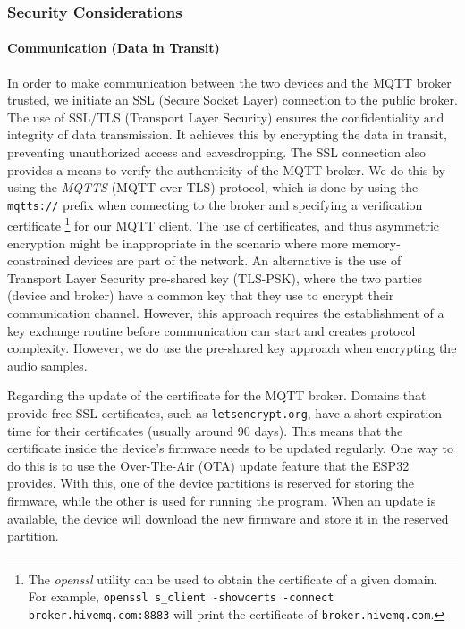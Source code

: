 \documentclass[conference]{IEEEtran}
\begin{document}
\subsubsection{Security Considerations}

\paragraph{Communication (Data in Transit)}

In order to make communication between the two devices and the MQTT broker
trusted, we initiate an SSL (Secure Socket Layer) connection to the public broker. 
The use of SSL/TLS (Transport Layer Security)
ensures the confidentiality and integrity of data transmission. 
It achieves this by encrypting the data in transit, preventing
unauthorized access and eavesdropping. The SSL connection also provides a means
to verify the authenticity of the MQTT broker.
We do this by using the \textit{MQTTS} (MQTT over TLS) protocol, which is done 
by using the \texttt{mqtts://} prefix when connecting to the broker and specifying 
a verification certificate
\footnote{The \textit{openssl} utility can be used to obtain the certificate of a given domain.
For example, \texttt{openssl s\_client -showcerts -connect broker.hivemq.com:8883} will print the certificate of \texttt{broker.hivemq.com}.}
for our MQTT client.
The use of certificates, and thus asymmetric encryption might be inappropriate in the scenario where more 
memory-constrained devices are part of the network. 
An alternative is the use of Transport Layer Security pre-shared key (TLS-PSK)\cite{rfc4279}, where the two parties 
(device and broker) have a common key that they use to encrypt their communication channel.
However, this approach requires the establishment of a key exchange routine before communication can start
and creates protocol complexity.
However, we do use the pre-shared key approach when encrypting the audio samples.

Regarding the update of the certificate for the MQTT broker.
Domains that provide free SSL certificates, such as \texttt{letsencrypt.org}, have a short expiration time for their certificates (usually around 90 days).
This means that the certificate inside the device's firmware needs to be updated regularly.
One way to do this is to use the Over-The-Air (OTA) update feature that the ESP32 provides.
With this, one of the device partitions is reserved for storing the firmware, while the other is used for running the program.
When an update is available, the device will download the new firmware and store it in the reserved partition.
\end{document}

